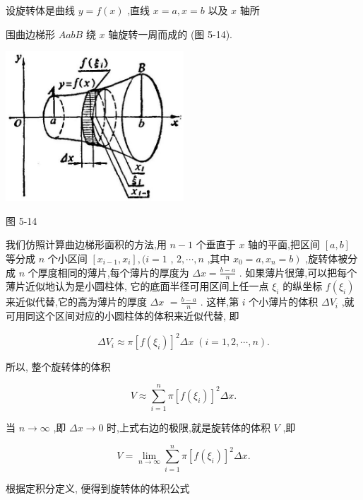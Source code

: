 \documentclass[lang=cn,newtx,10pt,scheme=chinese]{elegantbook}
\begin{document}
设旋转体是曲线 \(y = f\left( x\right)\) ,直线 \(x = a,x = b\) 以及 \(x\) 轴所

围曲边梯形 \({AabB}\) 绕 \(x\) 轴旋转一周而成的 (图 5-14).

\begin{center}
\includegraphics[max width=0.5\textwidth]{images/01912c18-5c3f-733d-b775-749ba9897a9d_236_380755.jpg}
\end{center}

图 5-14

我们仿照计算曲边梯形面积的方法,用 \(n - 1\) 个垂直于 \(x\) 轴的平面,把区间 \(\left\lbrack {a,b}\right\rbrack\) 等分成 \(n\) 个小区间 \(\left\lbrack {{x}_{i - 1},{x}_{i}}\right\rbrack ,(i = 1\) , \(2,\cdots ,n\) ,其中 \(\left. {{x}_{0} = a,{x}_{n} = b}\right)\) ,旋转体被分成 \(n\) 个厚度相同的薄片,每个薄片的厚度为 \({\Delta x} = \frac{b - a}{n}\) . 如果薄片很薄,可以把每个薄片近似地认为是小圆柱体, 它的底面半径可用区间上任一点 \({\xi }_{i}\) 的纵坐标 \(f\left( {\xi }_{i}\right)\) 来近似代替,它的高为薄片的厚度 \({\Delta x}\) \(= \frac{b - a}{n}\) . 这样,第 \(i\) 个小薄片的体积 \(\Delta {V}_{i}\) ,就可用同这个区间对应的小圆柱体的体积来近似代替, 即

\[
\Delta {V}_{i} \approx \pi {\left\lbrack f\left( {\xi }_{i}\right) \right\rbrack }^{2}{\Delta x}\;\left( {i = 1,2,\cdots ,n}\right) .
\]

所以, 整个旋转体的体积

\[
V \approx \mathop{\sum }\limits_{{i = 1}}^{n}\pi {\left\lbrack f\left( {\xi }_{i}\right) \right\rbrack }^{2}{\Delta x}.
\]

当 \(n \rightarrow \infty\) ,即 \({\Delta x} \rightarrow 0\) 时,上式右边的极限,就是旋转体的体积 \(V\) ,即

\[
V = \mathop{\lim }\limits_{{n \rightarrow \infty }}\mathop{\sum }\limits_{{i = 1}}^{n}\pi {\left\lbrack f\left( {\xi }_{i}\right) \right\rbrack }^{2}{\Delta x}.
\]

根据定积分定义, 便得到旋转体的体积公式
\end{document}
